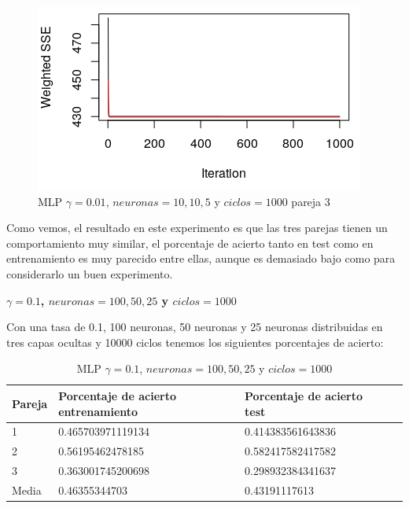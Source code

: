 \documentclass[11pt,spanish,listoffigures,listoftables]{workluis}
\begin{document}
\begin{figure}[H]
\centering
\includegraphics[scale=0.5]{001101053}
\caption{MLP $\gamma = 0.01$, $neuronas = 10,10,5$ y $ciclos = 1000$ pareja 3}
\end{figure} 

\par Como vemos, el resultado en este experimento es que las tres parejas tienen un comportamiento muy similar, el porcentaje de acierto tanto en test como en entrenamiento es muy parecido entre ellas, aunque es demasiado bajo como para considerarlo un buen experimento.


\par \textbf{$\gamma = 0.1$, $neuronas = 100,50,25$ y $ciclos = 1000$}

\par Con una tasa de 0.1, 100 neuronas, 50 neuronas y 25 neuronas distribuidas en tres capas ocultas y 10000 ciclos tenemos los siguientes porcentajes de acierto:

\begin{table}[H]
\centering
\caption{MLP $\gamma = 0.1$, $neuronas = 100,50,25$ y $ciclos = 1000$}
\label{tb:tb4}
\begin{tabular}{lllll}
\hline
\multicolumn{1}{|l|}{Pareja} & Porcentaje de acierto entrenamiento & Porcentaje de acierto test  \\ \hline \hline
1                            & 0.465703971119134    & 0.414383561643836 \\
2                            & 0.56195462478185     & 0.582417582417582 \\
3                            & 0.363001745200698    & 0.298932384341637 \\
Media                        & 0.46355344703        & 0.43191117613     \\ \hline
\end{tabular}
\end{table}
\end{document}
